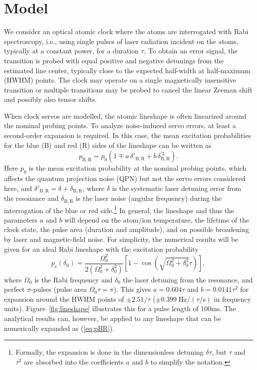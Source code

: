 \documentclass[10pt,a4paper]{iopart}
\newcommand{\eqref}[1]{(\ref{#1})}
\begin{document}
\section{Model \label{sec:model}}

We consider an optical atomic clock where the atoms are interrogated with Rabi spectroscopy, i.e., using single pulses of laser radiation incident on the atoms, typically at a constant power, for a duration $\tau$. To obtain an error signal, the transition is probed with equal positive and negative detunings from the estimated line center, typically close to the expected half-width at half-maximum (HWHM) points. The clock may operate on a single magnetically insensitive transition or multiple transitions may be probed to cancel the linear Zeeman shift and possibly also tensor shifts.

When clock servos are modelled, the atomic lineshape is often linearized around the nominal probing points. To analyze noise-induced servo errors, at least a second-order expansion is required.
In this case, the mean excitation probabilities for the blue (B) and red (R) sides of the lineshape can be written as
\begin{equation} \label{eq:pBR}
p_{\mathrm{B,R}} = p_0 ( 1 \mp a\, \delta'_{\mathrm{B,R}} + b\, \delta^{\prime 2}_{\mathrm{B,R}}).
\end{equation}
Here $p_0$ is the mean excitation probability at the nominal probing points, which affects the quantum projection noise (QPN) but not the servo errors considered here, and $\delta'_{\mathrm{B,R}} = \delta + \delta_{\mathrm{B,R}}$, where $\delta$ is the systematic laser detuning error from the resonance and $\delta_{\mathrm{B,R}}$ is the laser noise (angular frequency) during the interrogation of the blue or red side.\footnote{Formally, the expansion is done in the dimensionless detuning $\delta\tau$, but $\tau$ and $\tau^2$ are absorbed into the coefficients $a$ and $b$ to simplify the notation.}
In general, the lineshape and thus the parameters $a$ and $b$ will depend on the atom/ion temperature, the lifetime of the clock state, the pulse area (duration and amplitude), and on possible broadening by laser and magnetic-field noise.
For simplicity, the numerical results will be given for an ideal Rabi lineshape with the excitation probability
\begin{equation} \label{eq:rho_ee0}
p_\mathrm{e}(\delta_0) = \frac{\Omega_0^2}{2(\Omega_0^2 + \delta_0^2)} \left[1-\cos{\left(\sqrt{\Omega_0^2 + \delta_0^2} \tau\right)}\right],
\end{equation}
where $\Omega_0$ is the Rabi frequency and $\delta_0$ the laser detuning from the resonance,
and perfect $\pi$-pulses (pulse area $\Omega_0 \tau = \pi$).
This gives $a=0.604 \tau$ and $b = 0.0141 \tau^2$ for expansion around the HWHM points of $\pm 2.51/\tau$ ($\pm0.399\;\mathrm{Hz}/(\tau/\mathrm{s})$ in frequency units). Figure~\ref{fig:lineshape} illustrates this for a pulse length of 100\;ms. The analytical results can, however, be applied to any lineshape that can be numerically expanded as \eqref{eq:pBR}.
\end{document}
